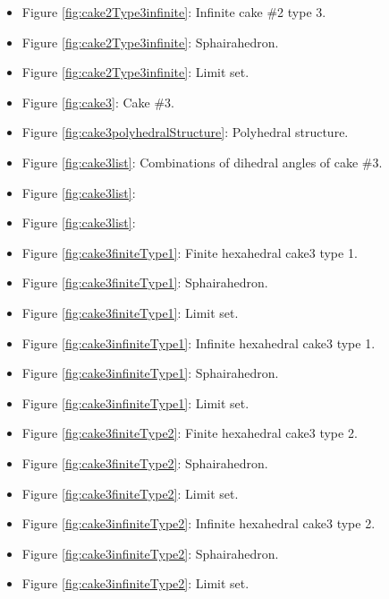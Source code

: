 \documentclass[suppldata, dvipdfmx]{interact}
\theoremstyle{plain}%
\theoremstyle{definition}
\theoremstyle{remark}
\theoremstyle{problemstyle}
\begin{document}
\begin{itemize}
\item Figure \ref{fig:cake2Type3infinite}: Infinite cake \#2 type 3.
\item Figure
      \ref{fig:cake2Type3infinite}:
      Sphairahedron.
\item Figure
      \ref{fig:cake2Type3infinite}:
      Limit set.

\item Figure \ref{fig:cake3}: Cake \#3.
\item Figure \ref{fig:cake3polyhedralStructure}: Polyhedral structure.

\item Figure \ref{fig:cake3list}: Combinations of dihedral angles of cake \#3.
\item Figure \ref{fig:cake3list}:
\item Figure \ref{fig:cake3list}:

\item Figure \ref{fig:cake3finiteType1}: Finite hexahedral cake3 type 1.
\item Figure
      \ref{fig:cake3finiteType1}:
      Sphairahedron.
\item Figure
      \ref{fig:cake3finiteType1}:
      Limit set.

\item Figure \ref{fig:cake3infiniteType1}: Infinite hexahedral cake3
      type 1.
\item Figure
      \ref{fig:cake3infiniteType1}:
      Sphairahedron.
\item Figure
      \ref{fig:cake3infiniteType1}:
      Limit set.

\item Figure \ref{fig:cake3finiteType2}: Finite hexahedral cake3
      type 2.
\item Figure
      \ref{fig:cake3finiteType2}:
      Sphairahedron.
\item Figure
      \ref{fig:cake3finiteType2}: 
      Limit set.

\item Figure \ref{fig:cake3infiniteType2}: Infinite hexahedral cake3
      type 2.
\item Figure
      \ref{fig:cake3infiniteType2}:
      Sphairahedron.
\item Figure
      \ref{fig:cake3infiniteType2}: 
      Limit set.


\end{itemize}
\end{document}
